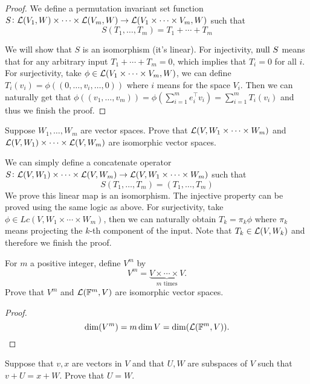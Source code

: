 \documentclass{extarticle}
\begin{document}
\begin{proof}
We define a permutation invariant set function \(S \colon \mathcal{L}(V_1, W) \times \cdots \times \mathcal{L}(V_m, W)
\to \mathcal{L}(V_1 \times \cdots \times V_m, W)\) such that 
\[S(T_1, \ldots, T_m) = T_1 + \cdots + T_m\]

We will show that \(S\) is an isomorphism (it's linear). For injectivity, \(\text{null } S\) means that 
for any arbitrary input \(T_1 + \cdots + T_m = 0\), which implies that \(T_i = 0\) for all \(i\). 
For surjectivity, take \(\phi \in \mathcal{L}(V_1 \times \cdots \times V_m, W)\), we can define 
\(T_i(v_i) = \phi((0, \ldots, v_i, \ldots, 0))\) where \(i\) means for the space \(V_i\). Then we can 
naturally get that \(\phi((v_1, \ldots, v_m))= \phi(\sum_{i=1}^{m}e_i^\top v_i) = \sum_{i=1}^{m} T_i (v_i) \)
and thus we finish the proof.
\end{proof}

\begin{problem}{4}
    Suppose \(W_1, \ldots, W_m\) are vector spaces. Prove that \(\mathcal{L}(V, W_1 \times \cdots \times W_m)\)
    and \(\mathcal{L}(V, W_1) \times \cdots \times \mathcal{L}(V, W_m)\) are isomorphic vector spaces. 
\end{problem}

We can simply define a concatenate operator \(S \colon \mathcal{L}(V, W_1) \times \cdots \times 
\mathcal{L}(V, W_m) \to \mathcal{L}(V, W_1 \times \cdots \times W_m)\) such that 
\[S(T_1, \ldots, T_m) = (T_1, \ldots, T_m)\]
We prove this linear map is an isomorphism. The injective property can be proved using the same logic as 
above. For surjectivity, take \(\phi \in Lc(V, W_1 \times \cdots \times W_m)\), then we can naturally 
obtain \(T_k = \pi_k \phi\) where \(\pi_k\) means projecting the \(k\)-th component of the input. Note that 
\(T_k \in \mathcal{L}(V, W_k)\) and therefore we finish the proof. 

\begin{problem}{5}
    For \(m\) a positive integer, define \(V^m\) by 
    \[V^m = \underbrace{V \times \cdots \times V}_{m \text{ times}}.\]
    Prove that \(V^m\) and \(\mathcal{L}(\mathbb{F}^m, V)\) are isomorphic vector spaces. 
\end{problem}

\begin{proof}
\[\dim (V^m) = m \dim V = \dim(\mathcal{L}(\mathbb{F}^m, V)).\]
\end{proof}

\begin{problem}{6}
    Suppose that \(v, x\) are vectors in \(V\) and that \(U, W\) are subspaces of \(V\)
    such that \(v + U = x + W\). Prove that \(U = W\).  
\end{problem}
\end{document}
